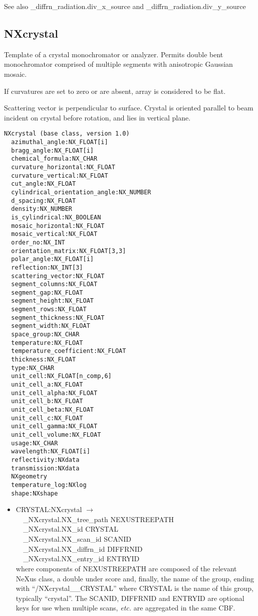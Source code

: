 \documentclass[11pt]{article}
\begin{document}
{{See also \_diffrn\_radiation.div\_x\_source and \_diffrn\_radiation.div\_y\_source

\subsection{NXcrystal}

Template of a crystal monochromator or analyzer. Permits double bent monochromator comprised of multiple segments with anisotropic Gaussian mosaic.

If curvatures are set to zero or are absent, array is considered to be flat.

Scattering vector is perpendicular to surface. Crystal is oriented parallel to beam incident on crystal before rotation, and lies in vertical plane.



\begin{verbatim}
NXcrystal (base class, version 1.0)
  azimuthal_angle:NX_FLOAT[i]
  bragg_angle:NX_FLOAT[i]
  chemical_formula:NX_CHAR
  curvature_horizontal:NX_FLOAT
  curvature_vertical:NX_FLOAT
  cut_angle:NX_FLOAT
  cylindrical_orientation_angle:NX_NUMBER
  d_spacing:NX_FLOAT
  density:NX_NUMBER
  is_cylindrical:NX_BOOLEAN
  mosaic_horizontal:NX_FLOAT
  mosaic_vertical:NX_FLOAT
  order_no:NX_INT
  orientation_matrix:NX_FLOAT[3,3]
  polar_angle:NX_FLOAT[i]
  reflection:NX_INT[3]
  scattering_vector:NX_FLOAT
  segment_columns:NX_FLOAT
  segment_gap:NX_FLOAT
  segment_height:NX_FLOAT
  segment_rows:NX_FLOAT
  segment_thickness:NX_FLOAT
  segment_width:NX_FLOAT
  space_group:NX_CHAR
  temperature:NX_FLOAT
  temperature_coefficient:NX_FLOAT
  thickness:NX_FLOAT
  type:NX_CHAR
  unit_cell:NX_FLOAT[n_comp,6]
  unit_cell_a:NX_FLOAT
  unit_cell_alpha:NX_FLOAT
  unit_cell_b:NX_FLOAT
  unit_cell_beta:NX_FLOAT
  unit_cell_c:NX_FLOAT
  unit_cell_gamma:NX_FLOAT
  unit_cell_volume:NX_FLOAT
  usage:NX_CHAR
  wavelength:NX_FLOAT[i]
  reflectivity:NXdata
  transmission:NXdata
  NXgeometry
  temperature_log:NXlog
  shape:NXshape
\end{verbatim}

\begin{itemize}

\item{CRYSTAL:NXcrystal $\rightarrow$\\
\verb|  |\_NXcrystal.NX\_tree\_path    NEXUSTREEPATH \\
\verb|  |\_NXcrystal.NX\_id            CRYSTAL\\
\verb|  |\_NXcrystal.NX\_scan\_id      SCANID \\
\verb|  |\_NXcrystal.NX\_diffrn\_id    DIFFRNID \\
\verb|  |\_NXcrystal.NX\_entry\_id     ENTRYID \\
where components of NEXUSTREEPATH are composed of the
relevant NeXus class, a double under score and, finally, the
name of the group, ending with ``/NXcrystal\_\_CRYSTAL''
where CRYSTAL is the name of this group, typically ``crystal''.
The SCANID, DIFFRNID and ENTRYID are optional keys for use
when multiple scans, {\it etc.} are aggregated in the same CBF.}


\end{itemize}}}
\end{document}
